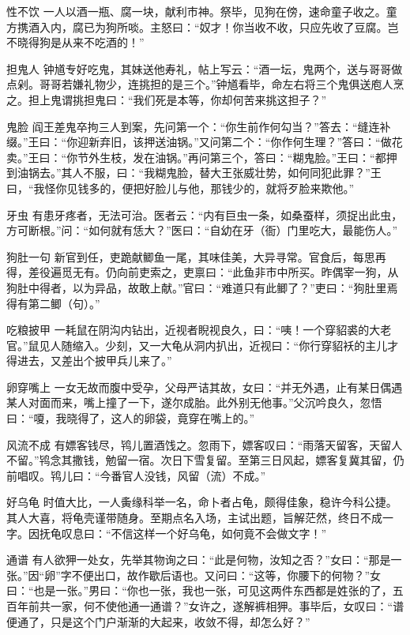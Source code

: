 \documentclass[12pt,UTF8]{ctexbook}
\begin{document}
性不饮
一人以酒一瓶、腐一块，献利市神。祭毕，见狗在傍，速命童子收之。童方携酒入内，腐已为狗所啖。主怒曰：“奴才！你当收不收，只应先收了豆腐。岂不晓得狗是从来不吃酒的！”

担鬼人
钟馗专好吃鬼，其妹送他寿礼，帖上写云：“酒一坛，鬼两个，送与哥哥做点剁。哥哥若嫌礼物少，连挑担的是三个。”钟馗看毕，命左右将三个鬼俱送庖人烹之。担上鬼谓挑担鬼曰：“我们死是本等，你却何苦来挑这担子？”

鬼脸
阎王差鬼卒拘三人到案，先问第一个：“你生前作何勾当？”答去：“缝连补缀。”王曰：“你迎新弃旧，该押送油锅。”又问第二个：“你作何生理？”答曰：“做花卖。”王曰：“你节外生枝，发在油锅。”再问第三个，答曰：“糊鬼脸。”王曰：“都押到油锅去。”其人不服，曰：“我糊鬼脸，替大王张威壮势，如何同犯此罪？”王曰，“我怪你见钱多的，便把好脸儿与他，那钱少的，就将歹脸来欺他。”

牙虫
有患牙疼者，无法可治。医者云：“内有巨虫一条，如桑蚕样，须捉出此虫，方可断根。”问：“如何就有恁大？”医曰：“自幼在牙（衙）门里吃大，最能伤人。”

狗肚一句
新官到任，吏跪献鲫鱼一尾，其味佳美，大异寻常。官食后，每思再得，差役遍觅无有。仍向前吏索之，吏禀曰：“此鱼非市中所买。昨偶宰一狗，从狗肚中得者，以为异品，故敢上献。”官曰：“难道只有此鲫了？”吏曰：“狗肚里焉得有第二鲫（句）。”

吃粮披甲
一耗鼠在阴沟内钻出，近视者睨视良久，曰：“咦！一个穿貂裘的大老官。”鼠见人随缩入。少刻，又一大龟从洞内扒出，近视曰：“你行穿貂袄的主儿才得进去，又差出个披甲兵儿来了。”

卵穿嘴上
一女无故而腹中受孕，父母严诘其故，女曰：“并无外遇，止有某日偶遇某人对面而来，嘴上撞了一下，遂尔成胎。此外别无他事。”父沉吟良久，忽悟曰：“嗄，我晓得了，这人的卵袋，竟穿在嘴上的。”

风流不成
有嫖客钱尽，鸨儿置酒饯之。忽雨下，嫖客叹曰：“雨落天留客，天留人不留。”鸨念其撒钱，勉留一宿。次日下雪复留。至第三日风起，嫖客复冀其留，仍前唱叹。鸨儿曰：“今番官人没钱，风留（流）不成。”

好乌龟
时值大比，一人夤缘科举一名，命卜者占龟，颇得佳象，稳许今科公捷。其人大喜，将龟壳谨带随身。至期点名入场，主试出题，旨解茫然，终日不成一字。因抚龟叹息曰：“不信这样一个好乌龟，如何竟不会做文字！”

通谱
有人欲狎一处女，先举其物询之曰：“此是何物，汝知之否？”女曰：“那是一张。”因“卵”字不便出口，故作歇后语也。又问曰：“这等，你腰下的何物？”女曰：“也是一张。”男曰：“你也一张，我也一张，可见这两件东西都是姓张的了，五百年前共一家，何不使他通一通谱？”女许之，遂解裤相狎。事毕后，女叹曰：“谱便通了，只是这个门户渐渐的大起来，收敛不得，却怎么好？”
\end{document}
